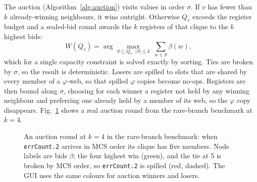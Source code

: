 \documentclass{ieeeaccess}
\newcommand{\tm}[1]{\texttt{#1}}
\begin{document}
The auction (Algorithm~\ref{alg:auction}) visits values in order
$\sigma$. If $v$ has fewer than $k$ already-winning neighbours, it wins
outright. Otherwise $Q_v$ exceeds the register budget and a sealed-bid
round awards the $k$ registers of that clique to the $k$ highest bids:
\begin{equation}
W(Q_v) = \arg\max_{S\subseteq Q_v,\ |S|\le k}\ \sum_{w\in S}\beta(w),
\label{eq:auction}
\end{equation}
which for a single capacity constraint is solved exactly by sorting.
Ties are broken by $\sigma$, so the result is deterministic. Losers are
spilled to slots that are shared by every member of a $\varphi$-web,
so that spilled $\varphi$ copies become no-ops. Registers are then bound
along $\sigma$, choosing for each winner a register not held by any
winning neighbour and preferring one already held by a member of its
web, so the $\varphi$ copy disappears. Fig.~\ref{fig:auction} shows a
real auction round from the rare-branch benchmark at $k=4$.

\begin{figure}[t]
\centering
{}
\caption{An auction round at $k=4$ in the rare-branch benchmark:
when \tm{errCount.2} arrives in MCS order its clique has five members.
Node labels are bids $\beta$; the four highest win (green), and the tie
at 5 is broken by MCS order, so \tm{errCount.2} is spilled (red, dashed).
The GUI uses the same colours for auction winners and losers.}
\label{fig:auction}
\end{figure}
\end{document}
